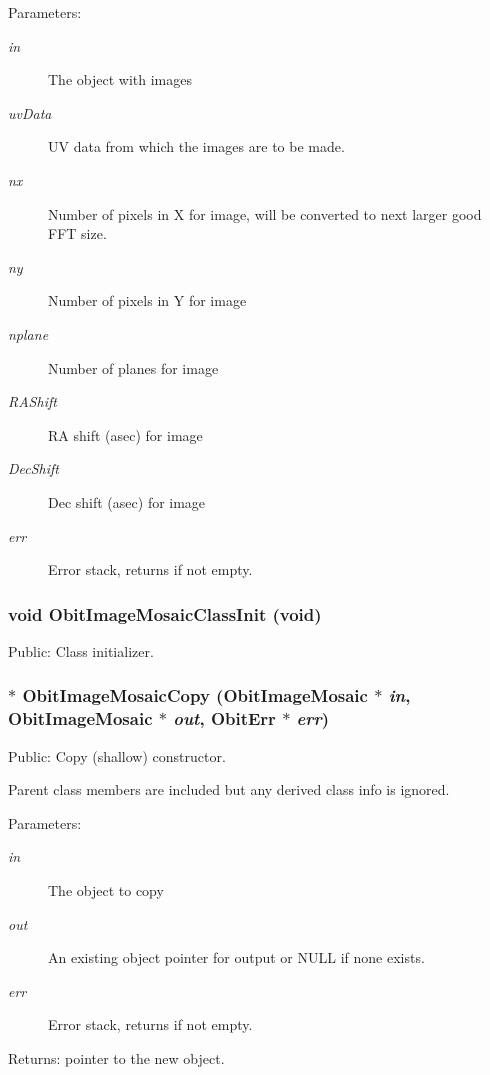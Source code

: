 \begin{Desc}
\item[Parameters:]
\begin{description}
\item[{\em in}]The object with images \item[{\em uv\-Data}]UV data from which the images are to be made. \item[{\em nx}]Number of pixels in X for image, will be converted to next larger good FFT size. \item[{\em ny}]Number of pixels in Y for image \item[{\em nplane}]Number of planes for image \item[{\em RAShift}]RA shift (asec) for image \item[{\em Dec\-Shift}]Dec shift (asec) for image \item[{\em err}]Error stack, returns if not empty. \end{description}
\end{Desc}
\subsubsection{\setlength{\rightskip}{0pt plus 5cm}void Obit\-Image\-Mosaic\-Class\-Init (void)}\label{ObitImageMosaic_8h_a5}


Public: Class initializer. 

\subsubsection{$\ast$ Obit\-Image\-Mosaic\-Copy ({\bf Obit\-Image\-Mosaic} $\ast$ {\em in}, {\bf Obit\-Image\-Mosaic} $\ast$ {\em out}, {\bf Obit\-Err} $\ast$ {\em err})}\label{ObitImageMosaic_8h_a9}


Public: Copy (shallow) constructor. 

Parent class members are included but any derived class info is ignored. \begin{Desc}
\item[Parameters:]
\begin{description}
\item[{\em in}]The object to copy \item[{\em out}]An existing object pointer for output or NULL if none exists. \item[{\em err}]Error stack, returns if not empty. \end{description}
\end{Desc}
\begin{Desc}
\item[Returns:]pointer to the new object. \end{Desc}
